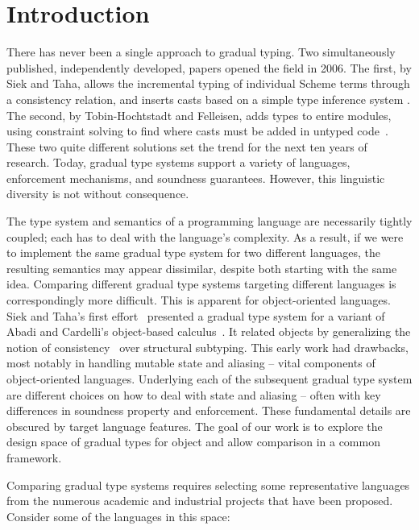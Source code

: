 \documentclass[a4paper,USenglish]{tex/lipics-v2016}
\begin{document}
\section{Introduction}


\noindent There has never been a single approach to gradual typing.  Two
simultaneously published, independently developed, papers opened the field
in 2006. The first, by Siek and Taha, allows the incremental typing of
individual Scheme terms through a consistency relation, and inserts casts
based on a simple type inference system \cite{SiekTaha06}. The second, by
Tobin-Hochtstadt and Felleisen, adds types to entire modules, using
constraint solving to find where casts must be added in untyped
code~\cite{tf-dls06}. These two quite different solutions set the trend for
the next ten years of research. Today, gradual type systems support a
variety of languages, enforcement mechanisms, and soundness
guarantees. However, this linguistic diversity is not without consequence.

The type system and semantics of a programming language are necessarily
tightly coupled; each has to deal with the language's complexity. As a
result, if we were to implement the same gradual type system for two
different languages, the resulting semantics may appear dissimilar, despite
both starting with the same idea. Comparing different gradual type systems
targeting different languages is correspondingly more difficult.  This is
apparent for object-oriented languages. Siek and Taha's first
effort~\cite{SiekTaha07} presented a gradual type system for a variant of
Abadi and Cardelli's object-based
calculus~\cite{cardelli:1996:theory-of-objects}. It related objects by
generalizing the notion of consistency~\cite{SiekTaha06} over structural
subtyping. This early work had drawbacks, most notably in handling mutable
state and aliasing -- vital components of object-oriented languages.
Underlying each of the subsequent gradual type system are different choices
on how to deal with state and aliasing -- often with key differences in
soundness property and enforcement. These fundamental details are obscured
by target language features. The goal of our work is to explore the design
space of gradual types for object and allow comparison in a common
framework.


Comparing gradual type systems requires selecting some representative
languages from the numerous academic and industrial projects that
have been proposed. Consider some of the languages in this space:
\end{document}
